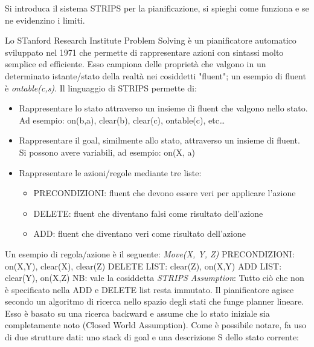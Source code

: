 \documentclass[answers, a4paper, 11pt]{exam}
\begin{document}
\begin{questions}
\question Si introduca il sistema STRIPS per la pianificazione, si spieghi come funziona e se ne evidenzino i limiti.
\begin{solution}
  Lo STanford Research Institute Problem Solving è un pianificatore automatico sviluppato nel 1971 che permette di rappresentare azioni con sintassi molto semplice ed efficiente. Esso campiona delle proprietà che valgono in un determinato istante/stato della realtà nei cosiddetti "fluent"; un esempio di fluent è \emph{ontable(c,s)}. 
  \newline Il linguaggio di STRIPS permette di:
  \begin{itemize}
    \item Rappresentare lo stato attraverso un insieme di fluent che valgono nello stato. Ad esempio: on(b,a), clear(b), clear(c), ontable(c), etc\dots
    \item Rappresentare il goal, similmente allo stato, attraverso un insieme di fluent. Si possono avere variabili, ad esempio: on(X, a)
    \item Rappresentare le azioni/regole mediante tre liste:
    \begin{itemize}
      \item PRECONDIZIONI: fluent che devono essere veri per applicare l'azione
      \item DELETE: fluent che diventano falsi come risultato dell'azione
      \item ADD: fluent che diventano veri come risultato dell'azione
    \end{itemize}
  \end{itemize}
  
  Un esempio di regola/azione è il seguente:
  \newline\emph{Move(X, Y, Z)}
  \newline PRECONDIZIONI: on(X,Y), clear(X), clear(Z)
  \newline DELETE LIST: clear(Z), on(X,Y)
  \newline ADD LIST: clear(Y), on(X,Z)
  \newline
  \newline NB: vale la cosiddetta \emph{STRIPS Assumption}: Tutto ciò che non è specificato nella ADD e DELETE list resta immutato.
  \newline Il pianificatore agisce secondo un algoritmo di ricerca nello spazio degli stati che funge planner lineare. Esso è basato su una ricerca backward e assume che lo stato iniziale sia completamente noto (Closed World Assumption).
  Come è possibile notare, fa uso di due strutture dati: uno stack di goal e una descrizione S dello stato corrente:


\end{solution}
\end{questions}
\end{document}
